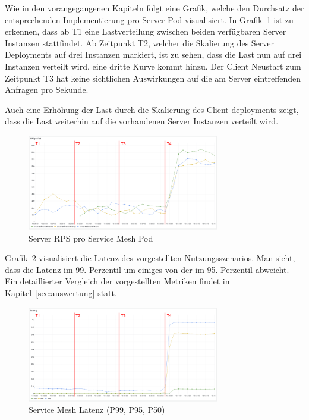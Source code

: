 Wie in den vorangegangenen Kapiteln folgt eine Grafik, welche den Durchsatz der entsprechenden Implementierung pro Server Pod visualisiert.
In Grafik~\ref{fig:mesh_rps} ist zu erkennen, dass ab T1 eine Lastverteilung zwischen beiden verfügbaren Server Instanzen stattfindet.
Ab Zeitpunkt T2, welcher die Skalierung des Server Deployments auf drei Instanzen markiert, ist zu sehen, dass die Last nun auf drei Instanzen verteilt wird, eine dritte Kurve kommt hinzu.
Der Client Neustart zum Zeitpunkt T3 hat keine sichtlichen Auswirkungen auf die am Server eintreffenden Anfragen pro Sekunde.

Auch eine Erhöhung der Last durch die Skalierung des Client deployments zeigt, dass die Last weiterhin auf die vorhandenen Server Instanzen verteilt wird.

\begin{figure}[H]
    \centering
    \includegraphics[width=0.75\textwidth]{img/mesh_rps}
    \caption{Server RPS pro Service Mesh Pod}
    \label{fig:mesh_rps}
\end{figure}

Grafik~\ref{fig:mesh_latenz} visualisiert die Latenz des vorgestellten Nutzungsszenarios.
Man sieht, dass die Latenz im 99. Perzentil um einiges von der im 95. Perzentil abweicht.
Ein detaillierter Vergleich der vorgestellten Metriken findet in Kapitel~\ref{sec:auswertung} statt.

\begin{figure}[H]
    \centering
    \includegraphics[width=0.75\textwidth]{img/mesh_latenz}
    \caption{Service Mesh Latenz (P99, P95, P50)}
    \label{fig:mesh_latenz}
\end{figure}

